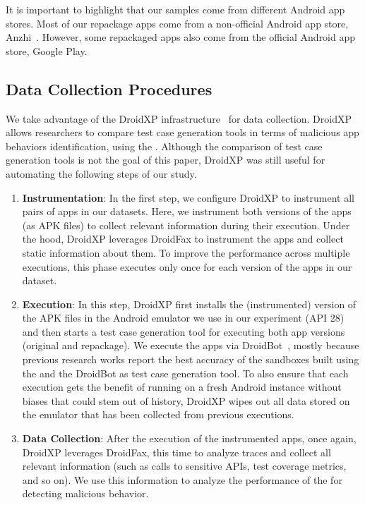 It is important to highlight that our samples come from different Android app stores. Most of our repackage apps come from a non-official
Android app store, Anzhi~\cite{anzhi}. However, some repackaged apps also come from the official Android app store, Google Play.


\subsection{Data Collection Procedures} \label{sec:dataCollectionProc}

We take advantage of the DroidXP infrastructure~\cite{DBLP:conf/scam/CostaMCMVBC20}
for data collection. DroidXP allows researchers to compare 
test case generation tools in terms of malicious app behaviors identification, using the \mas. Although the comparison of test
case generation tools is not the goal of this paper, DroidXP
was still useful for automating the following steps of our study.


\begin{enumerate}[S1]
 \item \textbf{Instrumentation}: In the first step,
we configure DroidXP to instrument all pairs of apps in our datasets.
Here, we instrument both versions of the apps (as APK files) to collect relevant information during their execution. Under the hood, DroidXP leverages
DroidFax to instrument the apps and collect static
information about them. To improve the performance across multiple executions,
this phase executes only once for each version of the apps in our dataset.

\item \textbf{Execution}: In this step, DroidXP first installs the (instrumented) version of the APK files in the Android emulator we use in our experiment (API 28) and then starts a test case generation tool for executing both app versions (original and repackage). We execute the apps via DroidBot~\cite{DBLP:conf/icse/LiYGC17}, mostly because previous research works report the best accuracy of the sandboxes built using the \mas and the DroidBot as test case generation tool. To also ensure that each execution gets the benefit of running on a fresh Android instance without biases that could stem out of history, DroidXP wipes out all data stored on the emulator that has been collected from previous executions.


\item \textbf{Data Collection}: After the execution of the instrumented apps, once again, DroidXP leverages DroidFax, this time to analyze traces and collect all relevant information (such as calls to sensitive APIs, test coverage metrics, and so on). We use this information to analyze the performance of the \mas for detecting malicious behavior.
\end{enumerate}


